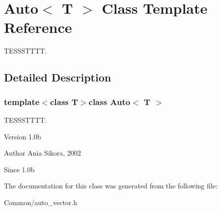 \hypertarget{class_auto}{\section{Auto$<$ T $>$ Class Template Reference}
\label{class_auto}
}


T\-E\-S\-S\-S\-T\-T\-T\-T.  




\subsection{Detailed Description}
\subsubsection*{template$<$class T$>$class Auto$<$ T $>$}

T\-E\-S\-S\-S\-T\-T\-T\-T. 

\begin{DoxyVersion}{Version}
1.\-0b 
\end{DoxyVersion}
\begin{DoxyAuthor}{Author}
Ania Sikora, 2002 
\end{DoxyAuthor}
\begin{DoxySince}{Since}
1.\-0b 
\end{DoxySince}


The documentation for this class was generated from the following file\-:\begin{DoxyCompactItemize}
\item 
Common/auto\-\_\-vector.\-h\end{DoxyCompactItemize}
